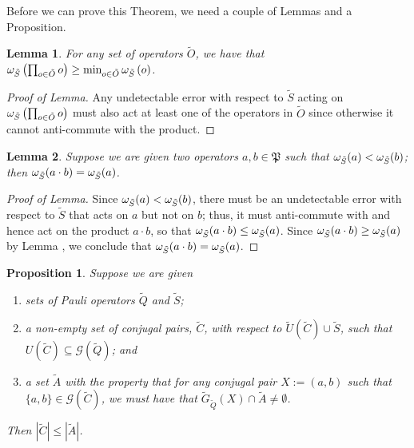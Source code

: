 \documentclass[twocolumn,showpacs,preprintnumbers,amsmath,amssymb,nofootinbib,pra,floatfix]{revtex4-1}
\newtheorem{proposition}{Proposition}
\newtheorem{lemma}{Lemma}
\newcommand{\set}{\tilde}
\newcommand{\genfun}{\mathcal{G}}
\newcommand{\pauligroup}{\mathfrak{P}}
\begin{document}
Before we can prove this Theorem, we need a couple of Lemmas and a Proposition.
\begin{lemma}
\label{combinations-can't-make-things-worse}
For any set of operators $\set O$, we have that $\om_{\set S}\paren{\prod_{o\in\set O} o} \ge \text{min}_{o\in \set O}\,\om_{\set S}\paren{o}$.
\end{lemma}

\begin{proof}[Proof of Lemma]
Any undetectable error with respect to $\set S$ acting on $\om_{\set S}\paren{\prod_{o\in\set O} o}$ must also act at least one of the operators in $\set O$ since otherwise it cannot anti-commute with the product. \end{proof}
\begin{lemma}
\label{lesser-operator-wins}
Suppose we are given two operators $a,b\in\pauligroup$ such that $\om_{\set S}(a)<\om_{\set S}(b)$;  then $\om_{\set S}(a\cdot b) = \om_{\set S}(a)$.
\end{lemma}

\begin{proof}[Proof of Lemma]
Since $\om_{\set S}(a)<\om_{\set S}(b)$, there must be an undetectable error with respect to $\set S$ that acts on $a$ but not on $b$;  thus, it must anti-commute with and hence act on the product $a\cdot b$, so that $\om_{\set S}(a\cdot b)\le \om_{\set S}(a)$.  Since $\om_{\set S}(a\cdot b)\ge \om_{\set S}(a)$ by Lemma , we conclude that $\om_{\set S}(a\cdot b) = \om_{\set S}(a)$.
\end{proof}
\begin{proposition}
\label{bound-on-recombinations}
Suppose we are given
\begin{enumerate}
\item sets of Pauli operators $\set Q$ and $\set S$;
\item a non-empty set of conjugal pairs, $\set C$, with respect to $\set U(\set C) \cup \set S$, such that $U(\set C)\subseteq \genfun(\set Q)$; and \item a set $\set A$ with the property that for any conjugal pair $X:=(a,b)$ such that $\{a,b\}\in\genfun(\set C)$, we must have that $\set G_{\set Q}(X) \cap \set A \ne \emptyset$.
\end{enumerate}
Then $|\set C|\le|\set A|$.
\end{proposition}
\end{document}
